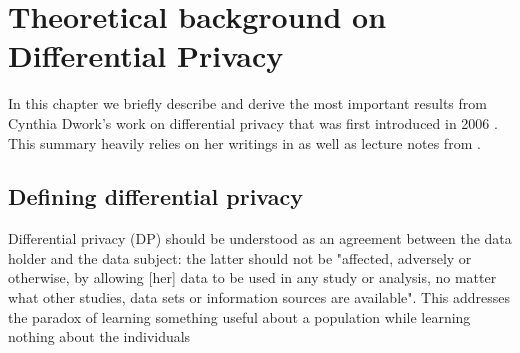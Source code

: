 \section{Theoretical background on Differential Privacy}\label{ch2}

In this chapter we briefly describe and derive the most important results from Cynthia Dwork's work on differential privacy that was first introduced in 2006 \parencite{dwork2006differential}. This summary heavily relies on her writings in \parencite{dwork2019differential} as well as lecture notes from \parencite{lecture_CSE711}.

\subsection{Defining differential privacy}
Differential privacy (DP) should be understood as an agreement between the data holder and the data subject: the latter should not be "affected, adversely or otherwise, by allowing [her] data to be used in any study or analysis, no matter what other studies, data sets or information sources are available". This addresses the paradox of learning something useful about a population while learning nothing about the individuals


